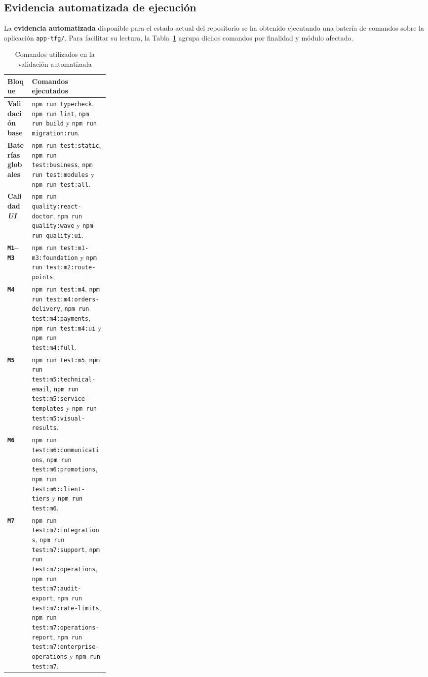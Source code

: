 \subsection{Evidencia automatizada de ejecución}

La \textbf{evidencia automatizada} disponible para el estado actual del repositorio se ha obtenido ejecutando una batería de comandos sobre la aplicación \texttt{app-tfg/}. Para facilitar su lectura, la Tabla~\ref{tab:test-command-groups} agrupa dichos comandos por finalidad y módulo afectado.

\begin{table}[H]
    \centering
    \small
    \renewcommand{\arraystretch}{1.16}
    \caption{Comandos utilizados en la validación automatizada}
    \label{tab:test-command-groups}
    \begin{tabularx}{\linewidth}{|p{0.24\linewidth}|X|}
        \hline
        \rowcolor{black!8}\textbf{Bloque} & \textbf{Comandos ejecutados} \\
        \hline
        \textbf{Validación base} & \texttt{npm run typecheck}, \texttt{npm run lint}, \texttt{npm run build} y \texttt{npm run migration:run}. \\
        \hline
        \textbf{Baterías globales} & \texttt{npm run test:static}, \texttt{npm run test:business}, \texttt{npm run test:modules} y \texttt{npm run test:all}. \\
        \hline
        \textbf{Calidad \textit{UI}} & \texttt{npm run quality:react-doctor}, \texttt{npm run quality:wave} y \texttt{npm run quality:ui}. \\
        \hline
        \textbf{\texttt{M1}--\texttt{M3}} & \texttt{npm run test:m1-m3:foundation} y \texttt{npm run test:m2:route-points}. \\
        \hline
        \textbf{\texttt{M4}} & \texttt{npm run test:m4}, \texttt{npm run test:m4:orders-delivery}, \texttt{npm run test:m4:payments}, \texttt{npm run test:m4:ui} y \texttt{npm run test:m4:full}. \\
        \hline
        \textbf{\texttt{M5}} & \texttt{npm run test:m5}, \texttt{npm run test:m5:technical-email}, \texttt{npm run test:m5:service-templates} y \texttt{npm run test:m5:visual-results}. \\
        \hline
        \textbf{\texttt{M6}} & \texttt{npm run test:m6:communications}, \texttt{npm run test:m6:promotions}, \texttt{npm run test:m6:client-tiers} y \texttt{npm run test:m6}. \\
        \hline
        \textbf{\texttt{M7}} & \texttt{npm run test:m7:integrations}, \texttt{npm run test:m7:support}, \texttt{npm run test:m7:operations}, \texttt{npm run test:m7:audit-export}, \texttt{npm run test:m7:rate-limits}, \texttt{npm run test:m7:operations-report}, \texttt{npm run test:m7:enterprise-operations} y \texttt{npm run test:m7}. \\
        \hline
    \end{tabularx}
\end{table}

